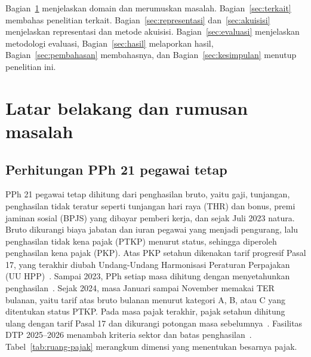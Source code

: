 \documentclass[conference]{IEEEtran}
\begin{document}
Bagian~\ref{sec:masalah} menjelaskan domain dan merumuskan masalah. Bagian~\ref{sec:terkait} membahas penelitian terkait. Bagian~\ref{sec:representasi} dan~\ref{sec:akuisisi} menjelaskan representasi dan metode akuisisi. Bagian~\ref{sec:evaluasi} menjelaskan metodologi evaluasi, Bagian~\ref{sec:hasil} melaporkan hasil, Bagian~\ref{sec:pembahasan} membahasnya, dan Bagian~\ref{sec:kesimpulan} menutup penelitian ini.

\section{Latar belakang dan rumusan masalah}
\label{sec:masalah}
\subsection{Perhitungan PPh 21 pegawai tetap}
PPh 21 pegawai tetap dihitung dari penghasilan bruto, yaitu gaji, tunjangan, penghasilan tidak teratur seperti tunjangan hari raya (THR) dan bonus, premi jaminan sosial (BPJS) yang dibayar pemberi kerja, dan sejak Juli 2023 natura. Bruto dikurangi biaya jabatan dan iuran pegawai yang menjadi pengurang, lalu penghasilan tidak kena pajak (PTKP) menurut status, sehingga diperoleh penghasilan kena pajak (PKP). Atas PKP setahun dikenakan tarif progresif Pasal 17, yang terakhir diubah Undang-Undang Harmonisasi Peraturan Perpajakan (UU HPP)~\cite{uu7_2021,pmk101_2016}. Sampai 2023, PPh setiap masa dihitung dengan menyetahunkan penghasilan~\cite{per16_2016}. Sejak 2024, masa Januari sampai November memakai TER bulanan, yaitu tarif atas bruto bulanan menurut kategori A, B, atau C yang ditentukan status PTKP. Pada masa pajak terakhir, pajak setahun dihitung ulang dengan tarif Pasal 17 dan dikurangi potongan masa sebelumnya~\cite{pp58_2023,pmk168_2023}. Fasilitas DTP 2025--2026 menambah kriteria sektor dan batas penghasilan~\cite{pmk10_2025,pmk72_2025,pmk105_2025}. Tabel~\ref{tab:ruang-pajak} merangkum dimensi yang menentukan besarnya pajak.
\end{document}
